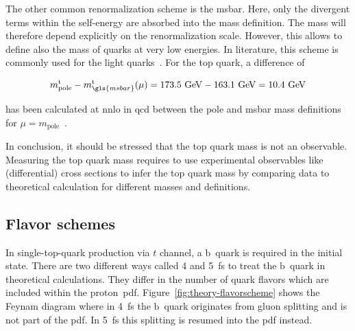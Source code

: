 The other common renormalization scheme is the \gls{msbar}. Here, only the divergent terms within the self-energy are absorbed into the mass definition. The mass will therefore depend explicitly on the renormalization scale. However, this allows to define also the mass of quarks at very low energies. In literature, this scheme is commonly used for the light quarks~\cite{Olive:2016xmw}. For the top quark, a difference of

\begin{equation}
m_\mathrm{pole}^\mathrm{t}-m_{\gls{msbar}}^\mathrm{t}(\mu)=173.5~\GeV-163.1~\GeV=10.4~\GeV
\end{equation}

has been calculated at \gls{nnlo} in \gls{qcd} between the pole and \gls{msbar} mass definitions for $\mu=m_\mathrm{pole}$~\cite{Jegerlehner:2012kn}.

In conclusion, it should be stressed that the top quark mass is not an observable. Measuring the top quark mass requires to use experimental observables like (differential) cross sections to infer the top quark mass by comparing data to theoretical calculation for different masses and definitions. 


\subsection{Flavor schemes}

In single-top-quark production via $t$ channel, a $\mathrm{b}$~quark is required in the initial state. There are two different ways called 4 and 5~\gls{fs} to treat the $\mathrm{b}$~quark in theoretical calculations. They differ in the number of quark flavors which are included within the proton~\gls{pdf}. Figure~\ref{fig:theory-flavorscheme} shows the Feynam diagram where in 4~\gls{fs} the $\mathrm{b}$~quark originates from gluon splitting and is not part of the \gls{pdf}. In 5~\gls{fs} this splitting is resumed into the \gls{pdf} instead.


